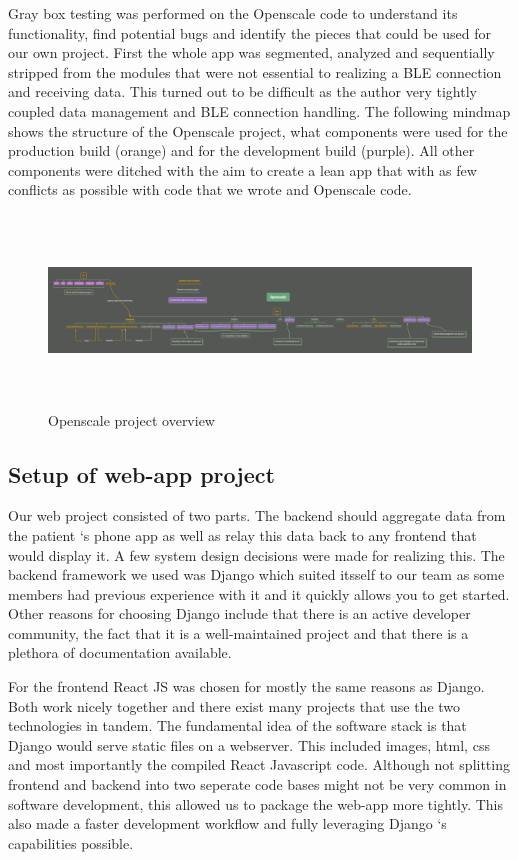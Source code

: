 Gray box testing was performed on the Openscale code to understand its functionality, find potential bugs and identify the pieces that could be used for our own project. First the whole app was segmented, analyzed and sequentially stripped from the modules that were not essential to realizing a BLE connection and receiving data. This turned out to be difficult as the author very tightly coupled data management and BLE connection handling. The following mindmap shows the structure of the Openscale project, what components were used for the production build (orange) and for the development build (purple). All other components were ditched with the aim to create a lean app that with as few conflicts as possible with code that we wrote and Openscale code.

\begin{figure}[h]
	\centering
	\includegraphics[width=\textwidth,height=2.0in]{./media/image1.png}
	\caption{Openscale project overview}
\end{figure}

\subsection{Setup of web-app project}

Our web project consisted of two parts. The backend should aggregate data from the patient ‘s phone app as well as relay this data back to any frontend that would display it. A few system design decisions were made for realizing this. The backend framework we used was Django which suited itsself to our team as some members had previous experience with it and it quickly allows you to get started. Other reasons for choosing Django include that there is an active developer community, the fact that it is a well-maintained project and that there is a plethora of documentation available.

For the frontend React JS was chosen for mostly the same reasons as Django. Both work nicely together and there exist many projects that use the two technologies in tandem. The fundamental idea of the software stack is that Django would serve static files on a webserver. This included images, html, css and most importantly the compiled React Javascript code. Although not splitting frontend and backend into two seperate code bases might not be very common in software development, this allowed us to package the web-app more tightly. This also made a faster development workflow and fully leveraging Django ‘s capabilities possible.

